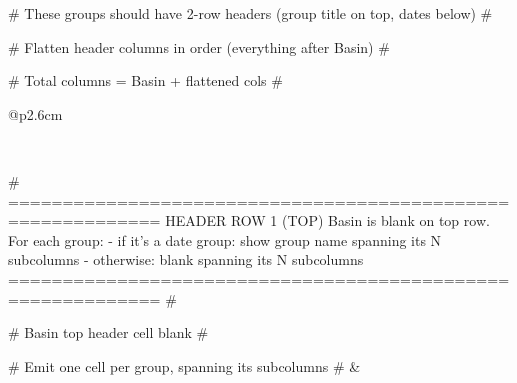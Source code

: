 \setlength{\tabcolsep}{2pt}
\renewcommand{\arraystretch}{1.2}
\setlength{\extrarowheight}{0pt}
\setlength{\aboverulesep}{0pt}
\setlength{\belowrulesep}{0pt}
{%
\fontsize{9}{11}\selectfont
{%
\fontsize{10}{12}\selectfont
{%

{# These groups should have 2-row headers (group title on top, dates below) #}
{%

{# Flatten header columns in order (everything after Basin) #}
{%
{%
  {%
    {%
  {%
{%

{# Total columns = Basin + flattened cols #}
{%


\begin{longtable}{@{}p{2.6cm}{%
    \toprule
     \\
    \specialrule{0.3pt}{0pt}{0pt}

    {# ============================================================
       HEADER ROW 1 (TOP)
       Basin is blank on top row.
       For each group:
         - if it's a date group: show group name spanning its N subcolumns
         - otherwise: blank spanning its N subcolumns
       ============================================================ #}

    {# Basin top header cell blank #}
    ~

    {%
    {%
        {%
        {%

        {# Emit one cell per group, spanning its subcolumns #}
        &
        {%
            \multicolumn{ {{ span }} }{c}{ {{ g_clean | replace('%
        {%
            {%
                ~
            {%
                \multicolumn{ {{ span }} }{c}{~}
            {%
        {%
    {%
    \\

}}}}}}}}}}}}}}}}
\end{longtable}}}}}}}}}}}}
